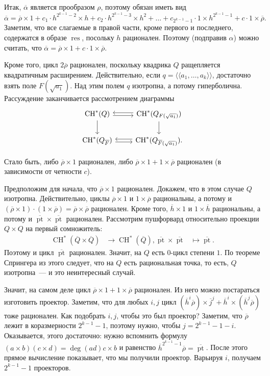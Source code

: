 \documentclass[a4paper]{article}
\DeclareMathOperator{\CH}{CH}
\DeclareMathOperator{\pt}{pt}
\DeclareMathOperator{\res}{res}
\theoremstyle{definition}
\newcommand{\lAngle}{\langle\!\langle}
\newcommand{\rAngle}{\rangle\!\rangle}
\newcommand{\ol}{\overline}
\begin{document}
Итак, $\ol{\alpha}$ является прообразом $\rho$, поэтому обязан иметь вид
\[
\ol{\alpha} = \ol{\rho}\times 1
+ c_1\cdot h^{2^{k-1}-2} \times h
+ c_2\cdot h^{2^{k-1}-3} \times h^2
+ \dots
+ c_{2^{k-1}-1}\cdot 1\times h^{2^{k-1}-1}
+ c\cdot 1\times\ol{\rho}.
\]
Заметим, что все слагаемые в правой части, кроме первого и последнего,
содержатся в образе $\res$, посольку $h$ рационален.
Поэтому (подправив $\alpha$) можно считать,
что $\ol\alpha = \ol\rho\times 1 + c\cdot 1 \times \ol\rho$.

Кроме того, цикл $2\ol\rho$ рационален, поскольку квадрика $Q$
ращепляется квадратичным расширением.
Действительно, если $q = \lAngle a_1,\dots,a_k\rAngle$, достаточно взять
поле $F(\sqrt{a_1})$.
Над этим полем $q$ изотропна, а потому гиперболична.
Рассуждение заканчивается рассмотрением диаграммы
\[
\begin{tikzcd}
\CH^*(Q) \arrow[yshift=-2pt]{r} \arrow{d} & \CH^*(Q_{F(\sqrt{a_1})}) \arrow{d}
\arrow[yshift=2pt]{l} \\
\CH^*(Q_{\ol{F}}) \arrow[yshift=-2pt]{r} & \CH^*(Q_{\ol{F}(\sqrt{a_1})}).
\arrow[yshift=2pt]{l}
\end{tikzcd}
\]

Стало быть, либо $\ol\rho\times 1$ рационален, либо
$\ol\rho\times 1 + 1\times\ol\rho$ рационален (в зависимости от четности $c$).

Предположим для начала, что $\ol\rho\times 1$ рационален.
Докажем, что в этом случае $Q$ изотропна.
Действительно, циклы $\ol\rho\times 1$ и $1\times\ol\rho$ рациональны,
а потому и $(\ol\rho\times 1)\cdot(1\times\ol\rho) = \ol\rho\times\ol\rho$
рационален.
Кроме того, $\ol{h}\times 1$ и $1\times\ol{h}$ рациональны,
а потому и $\ol{\pt}\times\ol{\pt}$ рационален.
Рассмотрим пушфорвард относительно проекции $Q\times Q$ на первый сомножитель:
\begin{align*}
\CH^*(\ol{Q}\times\ol{Q}) &\to \CH^*(\ol{Q}),
\ol{\pt}\times\ol{\pt} &\mapsto \ol{\pt}.
\end{align*}
Поэтому и цикл $\ol{\pt}$ рационален.
Значит, на $Q$ есть $0$-цикл степени $1$.
По теореме Спрингера из этого следует, что на $Q$ есть рациональная точка,
то есть, $Q$ изотропна~--- и это неинтересный случай.

Значит, на самом деле цикл $\ol\rho\times 1 + 1\times\ol\rho$
рационален.
Из него можно постараться изготовить проектор.
Заметим, что для любых $i,j$ цикл
$(\ol{h}^i\ol\rho)\times \ol{j}^j + \ol{h}^i\times (\ol{h}^j\ol\rho)$
тоже рационален.
Как подобрать $i,j$, чтобы это был проектор?
Заметим, что $\ol\rho$ лежит в коразмерности $2^{k-1} - 1$,
поэтому нужно, чтобы $j = 2^{k-1} - 1 - i$.
Оказывается, этого достаточно: нужно вспомнить формулу
$(a\times b)(c\times d) = \deg(ad)c\times b$
и равенство $\ol{h}^{2^{k-1}-1}\ol\rho = \ol{\pt}$.
После этого прямое вычисление показывает, что
мы получили проектор.
Варьируя $i$, получаем $2^{k-1} - 1$ проекторов.
\end{document}

